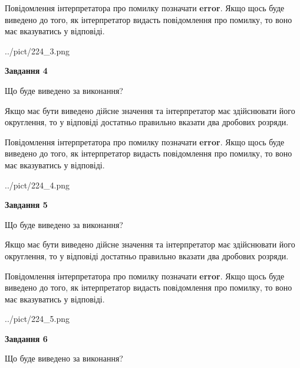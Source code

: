 \documentclass[12pt, ukrainian]{article}
\begin{document}
{\begin {Large}
Повідомлення інтерпретатора про помилку позначати \textbf{error}.
Якщо щось буде виведено до того, як інтерпретатор видасть повідомлення про помилку, 
то воно має вказуватись у відповіді. \par

\begin{center}
	{../pict/224_3.png}
\end{center}
\newpage

{\begin {center}\textbf{Завдання 4}\end {center}}\par
Що буде виведено за виконання? \par

Якщо має бути виведено дійсне значення та інтерпретатор має здійснювати його округлення, 
то у відповіді достатньо правильно вказати два дробових розряди.

Повідомлення інтерпретатора про помилку позначати \textbf{error}.
Якщо щось буде виведено до того, як інтерпретатор видасть повідомлення про помилку, 
то воно має вказуватись у відповіді. \par

\begin{center}
	{../pict/224_4.png}
\end{center}
\newpage

{\begin {center}\textbf{Завдання 5}\end {center}}\par
Що буде виведено за виконання? \par

Якщо має бути виведено дійсне значення та інтерпретатор має здійснювати його округлення, 
то у відповіді достатньо правильно вказати два дробових розряди.

Повідомлення інтерпретатора про помилку позначати \textbf{error}.
Якщо щось буде виведено до того, як інтерпретатор видасть повідомлення про помилку, 
то воно має вказуватись у відповіді. \par

\begin{center}
	{../pict/224_5.png}
\end{center}
\newpage

{\begin {center}\textbf{Завдання 6}\end {center}}\par
Що буде виведено за виконання? \par


\end{Large}}
\end{document}
